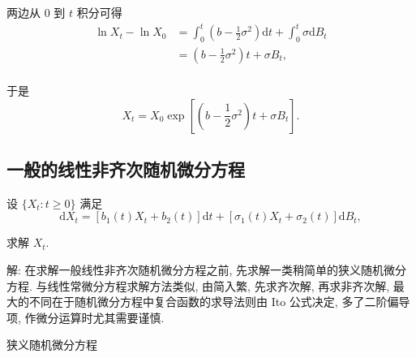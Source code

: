 \documentclass[openany]{ctexbook}
\theoremstyle{kaiti}
\theoremstyle{normal}
\begin{document}
两边从 $0$ 到 $t$ 积分可得
\begin{equation}
  \begin{aligned}
    \ln X_t-\ln X_0
    &=\int_{0}^t\left(b-\frac{1}{2}\sigma^2\right)\mathrm{d}t+\int_{0}^t\sigma\mathrm{d}B_t\\
    &=\left(b-\frac{1}{2}\sigma^2\right)t+\sigma B_t,\\
  \end{aligned}
\end{equation}

于是
\begin{equation}
  X_t=X_0\exp\left[\left(b-\frac{1}{2}\sigma^2\right)t+\sigma B_t\right].
\end{equation}

\subsection{一般的线性非齐次随机微分方程}

设 $\{X_t:t\geqslant0\}$ 满足
\begin{equation}
  \mathrm{d}X_t=[b_1(t) X_t+b_2(t)]\mathrm{d}t+[\sigma_1(t) X_t+\sigma_2(t)]\mathrm{d}B_t,
\end{equation}

求解 $X_t$.

解: 在求解一般线性非齐次随机微分方程之前, 先求解一类稍简单的狭义随机微分方程. 与线性常微分方程求解方法类似, 由简入繁, 先求齐次解, 再求非齐次解, 最大的不同在于随机微分方程中复合函数的求导法则由 Ito 公式决定, 多了二阶偏导项, 作微分运算时尤其需要谨慎.

狭义随机微分方程
\end{document}

